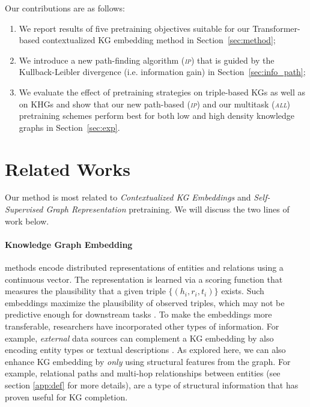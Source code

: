 \documentclass{article}
\newcommand{\ipa}{\textsl{\textsc{ip}}\xspace}
\newcommand{\all}{\textsl{\textsc{all}}\xspace}
\begin{document}
Our contributions are as follows:
\begin{enumerate}
\item We report results of five pretraining objectives suitable for our Transformer-based contextualized KG embedding method in Section~\ref{sec:method}; 
\item We introduce a new path-finding algorithm (\ipa) that is guided by the Kullback-Leibler divergence (i.e. information gain) in Section~\ref{sec:info_path};
\item We evaluate the effect of pretraining strategies on triple-based KGs as well as on KHGs and show that our new path-based (\ipa) and our multitask (\all) pretraining schemes perform best for both low and high density knowledge graphs in Section~\ref{sec:exp}.
 \end{enumerate}
 

\section{Related Works}
\label{sec:lit_review}

Our method is most related to \emph{Contextualized KG Embeddings}\cite{coke} and \emph{Self-Supervised Graph Representation} pretraining. We will discuss the two lines of work below.

\paragraph{Knowledge Graph Embedding} methods encode distributed representations of entities and relations using a continuous vector. 
The representation is learned via a scoring function that measures the plausibility that a given triple $\{(h_i, r_i, t_i)\}$ exists. Such embeddings maximize the plausibility of observed triples, which may not be predictive enough for downstream tasks \cite{kg-emb-rules-2015,large-kgcomp-2015}. 
To make the embeddings more transferable, researchers have incorporated other types of information. 
For example, \emph{external} data sources can complement a KG embedding by also encoding entity types \cite{guo-etal-2015-semantically,hiear-kgemb-2016} or textual descriptions \cite{kgemb_descrip-2016,text-enhanced-kgemb-2016}.
As explored here, we can also enhance KG embedding by \emph{only} using structural features from the graph. For example, relational paths and multi-hop relationships between entities (see section \ref{app:def} for more details), are a type of structural information that has proven useful \cite{lin-etal-2015-modeling,toutanova-etal-2016-compositional,das-etal-2017-chains} for KG completion. 
\end{document}
